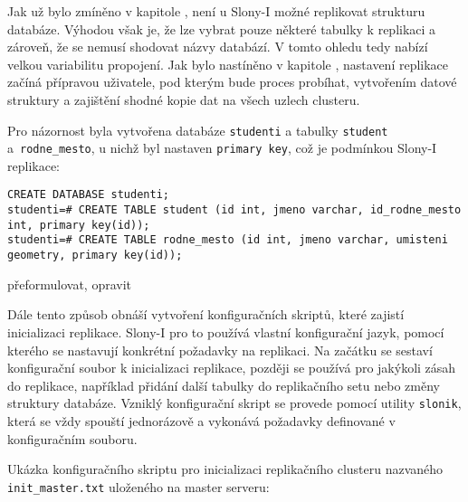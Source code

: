 Jak už bylo zmíněno v kapitole , není u Slony-I možné
replikovat strukturu databáze. Výhodou však je, že lze vybrat pouze některé
tabulky k replikaci a zároveň, že se nemusí shodovat názvy databází. V tomto
ohledu tedy nabízí velkou variabilitu propojení. Jak bylo nastíněno v kapitole
, nastavení replikace začíná přípravou uživatele, pod
kterým bude proces probíhat, vytvořením datové struktury a zajištění shodné
kopie dat na všech uzlech clusteru.

Pro názornost byla vytvořena databáze \texttt{studenti} a tabulky
\texttt{student} a~\texttt{rodne\_mesto}, u nichž byl nastaven \texttt{primary
key}, což je podmínkou Slony-I replikace:

\begin{lstlisting}
CREATE DATABASE studenti;
studenti=# CREATE TABLE student (id int, jmeno varchar, id_rodne_mesto int, primary key(id));
studenti=# CREATE TABLE rodne_mesto (id int, jmeno varchar, umisteni geometry, primary key(id));
\end{lstlisting}

\begin{framed}
  přeformulovat, opravit
\end{framed}
Dále tento způsob obnáší vytvoření konfiguračních skriptů, které zajistí
inicializaci replikace. Slony-I pro to používá vlastní konfigurační jazyk,
pomocí kterého se nastavují konkrétní požadavky na replikaci. Na začátku se
sestaví konfigurační soubor k inicializaci replikace, později se používá pro
jakýkoli zásah do replikace, například přidání další tabulky do replikačního
setu nebo změny struktury databáze. Vzniklý konfigurační skript se provede
pomocí utility \texttt{slonik}, která se vždy spouští jednorázově a vykonává
požadavky definované v konfiguračním souboru.

Ukázka konfiguračního skriptu pro inicializaci replikačního clusteru nazvaného
\texttt{init\_master.txt} uloženého na master serveru:

